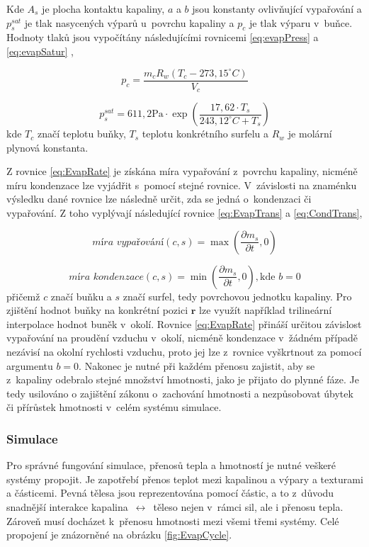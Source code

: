 Kde $A_s$ je plocha kontaktu kapaliny, $a$ a $b$ jsou konstanty ovlivňující vypařování a $p_s^{sat}$ je tlak nasycených výparů u~povrchu kapaliny a $p_c$ je tlak výparu v~buňce. Hodnoty tlaků jsou vypočítány následujícími rovnicemi \ref{eq:evapPress} a \ref{eq:evapSatur} \cite{yau1996short},

\begin{equation}
	p_c = \frac{m_c R_w(T_c - 273,15^{\circ}C)}{V_c}
	\label{eq:evapPress}
\end{equation}

\begin{equation}
	p_s^{sat} = 611,2 \text{Pa} \cdot \exp\left({\frac{17,62 \cdot T_s}{243,12^{\circ}C + T_s}}\right)
	\label{eq:evapSatur}
\end{equation}
kde $T_c$ značí teplotu buňky, $T_s$ teplotu konkrétního surfelu a $R_w$ je molární plynová konstanta.


Z rovnice \ref{eq:EvapRate} je získána míra vypařování z~povrchu kapaliny, nicméně míru kondenzace lze vyjádřit s~pomocí stejné rovnice. V~závislosti na znaménku výsledku dané rovnice lze následně určit, zda se jedná o~kondenzaci či vypařování. Z toho vyplývají následující rovnice \ref{eq:EvapTrans} a \ref{eq:CondTrans},

\begin{equation}
	\textit{míra vypařování}(c,s) = \max\left(\frac{\partial m_s}{\partial t}, 0\right)
	\label{eq:EvapTrans}
\end{equation}

\begin{equation}
	\textit{míra kondenzace}(c,s) = \min\left(\frac{\partial m_s}{\partial t}, 0\right), \text{kde } b = 0
	\label{eq:CondTrans}
\end{equation}
přičemž $c$ značí buňku a $s$ značí surfel, tedy povrchovou jednotku kapaliny. Pro zjištění hodnot buňky na konkrétní pozici $\mathbf{r}$ lze využít například trilineární interpolace hodnot buněk v~okolí. Rovnice \ref{eq:EvapRate} přináší určitou závislost vypařování na proudění vzduchu v~okolí, nicméně kondenzace v~žádném případě nezávisí na okolní rychlosti vzduchu, proto jej lze z~rovnice vyškrtnout za pomocí argumentu $b=0$. Nakonec je nutné při každém přenosu zajistit, aby se z~kapaliny odebralo stejné množství hmotnosti, jako je přijato do plynné fáze. Je tedy usilováno o zajištění zákonu o~zachování hmotnosti a nezpůsobovat úbytek či přírůstek hmotnosti v~celém systému simulace.

\subsubsection{Simulace}
Pro správné fungování simulace, přenosů tepla a hmotností je nutné veškeré systémy propojit. Je zapotřebí přenos teplot mezi kapalinou a výpary a texturami a částicemi. Pevná tělesa jsou reprezentována pomocí částic, a to z~důvodu snadnější interakce kapalina~$\leftrightarrow$~\mbox{těleso} nejen v~rámci sil, ale i přenosu tepla. Zároveň musí docházet k~přenosu hmotnosti mezi všemi třemi systémy. Celé propojení je znázorněné na obrázku \ref{fig:EvapCycle}.

